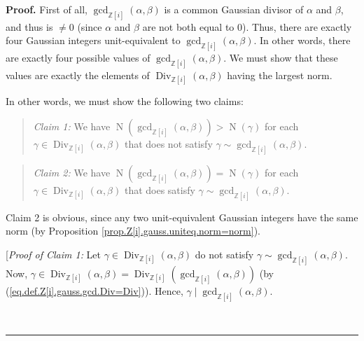 \documentclass[numbers=enddot,12pt,final,onecolumn,notitlepage]{scrartcl}%
\numberwithin{exer}{subsection}
\theoremstyle{definition}
\newenvironment{statement}{\begin{quote}}{\end{quote}}
\newenvironment{proof}[1][Proof]{\noindent\textbf{#1.} }{\ \rule{0.5em}{0.5em}}
\begin{document}
\begin{proof}
First of all, $\gcd\nolimits_{\mathbb{Z}\left[  i\right]  }\left(
\alpha,\beta\right)  $ is a common Gaussian divisor of $\alpha$ and $\beta$,
and thus is $\neq0$ (since $\alpha$ and $\beta$ are not both equal to $0$).
Thus, there are exactly four Gaussian integers unit-equivalent to
$\gcd\nolimits_{\mathbb{Z}\left[  i\right]  }\left(  \alpha,\beta\right)  $.
In other words, there are exactly four possible values of $\gcd
\nolimits_{\mathbb{Z}\left[  i\right]  }\left(  \alpha,\beta\right)  $. We
must show that these values are exactly the elements of $\operatorname*{Div}%
\nolimits_{\mathbb{Z}\left[  i\right]  }\left(  \alpha,\beta\right)  $ having
the largest norm.

In other words, we must show the following two claims:

\begin{statement}
\textit{Claim 1:} We have $\operatorname*{N}\left(  \gcd\nolimits_{\mathbb{Z}%
\left[  i\right]  }\left(  \alpha,\beta\right)  \right)  >\operatorname*{N}%
\left(  \gamma\right)  $ for each $\gamma\in\operatorname*{Div}%
\nolimits_{\mathbb{Z}\left[  i\right]  }\left(  \alpha,\beta\right)  $ that
does not satisfy $\gamma\sim\gcd\nolimits_{\mathbb{Z}\left[  i\right]
}\left(  \alpha,\beta\right)  $.
\end{statement}

\begin{statement}
\textit{Claim 2:} We have $\operatorname*{N}\left(  \gcd\nolimits_{\mathbb{Z}%
\left[  i\right]  }\left(  \alpha,\beta\right)  \right)  =\operatorname*{N}%
\left(  \gamma\right)  $ for each $\gamma\in\operatorname*{Div}%
\nolimits_{\mathbb{Z}\left[  i\right]  }\left(  \alpha,\beta\right)  $ that
does satisfy $\gamma\sim\gcd\nolimits_{\mathbb{Z}\left[  i\right]  }\left(
\alpha,\beta\right)  $.
\end{statement}

Claim 2 is obvious, since any two unit-equivalent Gaussian integers have the
same norm (by Proposition \ref{prop.Z[i].gauss.uniteq.norm=norm}).

[\textit{Proof of Claim 1:} Let $\gamma\in\operatorname*{Div}%
\nolimits_{\mathbb{Z}\left[  i\right]  }\left(  \alpha,\beta\right)  $ do not
satisfy $\gamma\sim\gcd\nolimits_{\mathbb{Z}\left[  i\right]  }\left(
\alpha,\beta\right)  $. Now, $\gamma\in\operatorname*{Div}%
\nolimits_{\mathbb{Z}\left[  i\right]  }\left(  \alpha,\beta\right)
=\operatorname*{Div}\nolimits_{\mathbb{Z}\left[  i\right]  }\left(
\gcd\nolimits_{\mathbb{Z}\left[  i\right]  }\left(  \alpha,\beta\right)
\right)  $ (by (\ref{eq.def.Z[i].gauss.gcd.Div=Div})). Hence, $\gamma\mid
\gcd\nolimits_{\mathbb{Z}\left[  i\right]  }\left(  \alpha,\beta\right)  $.


\end{proof}
\end{document}
